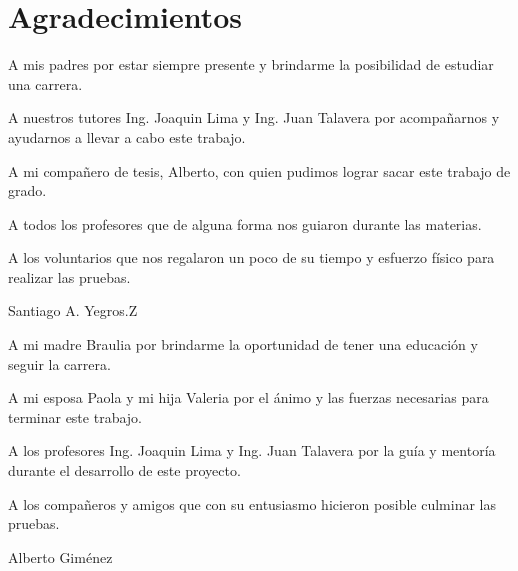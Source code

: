 
\chapter*{Agradecimientos}

A mis padres por estar siempre presente y brindarme la posibilidad de estudiar una carrera.

A nuestros tutores Ing. Joaquin Lima y Ing. Juan Talavera por acompañarnos y ayudarnos a llevar a cabo este trabajo.

A mi compañero de tesis, Alberto, con quien pudimos lograr sacar este trabajo de grado.

A todos los profesores que de alguna forma nos guiaron durante las materias.

A los voluntarios que nos regalaron un poco de su tiempo y esfuerzo físico para realizar las pruebas.

\begin{flushright}
	Santiago A. Yegros.Z
\end{flushright}

A mi madre Braulia por brindarme la oportunidad de tener una educación y seguir la carrera.

A mi esposa Paola y mi hija Valeria por el ánimo y las fuerzas necesarias para terminar este trabajo.

A los profesores Ing. Joaquin Lima y Ing. Juan Talavera por la guía y mentoría durante el desarrollo de este proyecto.

A los compañeros y amigos que con su entusiasmo hicieron posible culminar las pruebas.

\begin{flushright}
	Alberto Giménez
\end{flushright}
